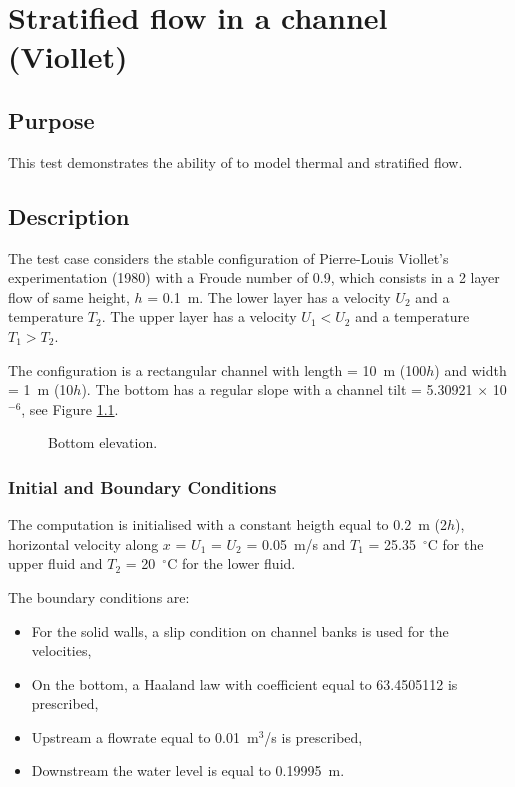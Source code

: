 \chapter{Stratified flow in a channel (Viollet)}

\section{Purpose}

This test demonstrates the ability of  to model thermal and stratified flow.

\section{Description}

The test case considers the stable configuration of Pierre-Louis Viollet’s experimentation
(1980) with a Froude number of 0.9, which consists in a 2 layer flow of same height,
$h$ = 0.1~m.
The lower layer has a velocity $U_2$ and a temperature $T_2$.
The upper layer has a velocity $U_1 < U_2$ and a temperature $T_1 > T_2$.

The configuration is a rectangular channel with length = 10~m (100$h$)
and width = 1~m (10$h$).
The bottom has a regular slope with a channel tilt = 5.30921 $\times$ 10$^{-6}$,
see Figure \ref{fig:Viollet:Bottom}.

\begin{figure}[H]
 \centering
  \caption{Bottom elevation.}\label{fig:Viollet:Bottom}
\end{figure}

\subsection{Initial and Boundary Conditions}

The computation is initialised with a constant heigth equal to 0.2~m (2$h$),
horizontal velocity along $x$ = $U_1$ = $U_2$ = 0.05~m/s
and $T_1$ = 25.35~$^\circ$C for the upper fluid and $T_2$ = 20~$^\circ$C
for the lower fluid.

The boundary conditions are:
\begin{itemize}
\item For the solid walls, a slip condition on channel banks is used for the
velocities,
\item On the bottom, a Haaland law with coefficient equal to 63.4505112
is prescribed,
\item Upstream a flowrate equal to 0.01~m$^3$/s is prescribed,
\item Downstream the water level is equal to 0.19995~m.
\end{itemize}

